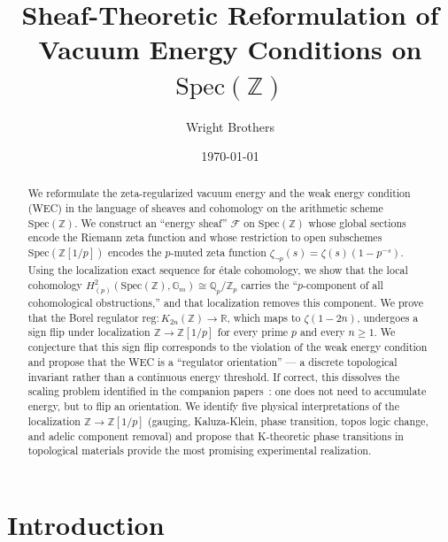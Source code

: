 \documentclass[aps,prd,twocolumn,superscriptaddress,nofootinbib]{revtex4-2}
\newcommand{\Spec}{\mathrm{Spec}}
\newcommand{\Zp}{\mathbb{Z}[1/p]}
\newcommand{\Qp}{\mathbb{Q}_p}
\newcommand{\Gm}{\mathbb{G}_m}
\begin{document}
\title{Sheaf-Theoretic Reformulation of\\
  Vacuum Energy Conditions on $\Spec(\mathbb{Z})$}

\author{Wright Brothers}
\date{\today}

\begin{abstract}
We reformulate the zeta-regularized vacuum energy and the weak
energy condition (WEC) in the language of sheaves and cohomology
on the arithmetic scheme $\Spec(\mathbb{Z})$.
We construct an ``energy sheaf'' $\mathcal{F}$ on $\Spec(\mathbb{Z})$
whose global sections encode the Riemann zeta function and whose
restriction to open subschemes $\Spec(\Zp)$ encodes the $p$-muted
zeta function $\zeta_{\neg p}(s) = \zeta(s)(1-p^{-s})$.
Using the localization exact sequence for \'etale cohomology,
we show that the local cohomology $H^2_{(p)}(\Spec(\mathbb{Z}), \Gm) \cong \Qp/\mathbb{Z}_p$
carries the ``$p$-component of all cohomological obstructions,''
and that localization removes this component.
We prove that the Borel regulator $\mathrm{reg}: K_{2n}(\mathbb{Z}) \to \mathbb{R}$,
which maps to $\zeta(1-2n)$, undergoes a sign flip under localization
$\mathbb{Z} \to \Zp$ for every prime $p$ and every $n \geq 1$.
We conjecture that this sign flip corresponds to the violation of
the weak energy condition and propose that the WEC is a
``regulator orientation'' --- a discrete topological invariant
rather than a continuous energy threshold.
If correct, this dissolves the scaling problem identified in the
companion papers~\cite{paper_A,paper_C}: one does not need to
accumulate energy, but to flip an orientation.
We identify five physical interpretations of the localization
$\mathbb{Z} \to \Zp$ (gauging, Kaluza-Klein, phase transition,
topos logic change, and adelic component removal) and propose
that K-theoretic phase transitions in topological materials
provide the most promising experimental realization.
\end{abstract}

\maketitle

\section{Introduction}
\label{sec:intro}
\end{document}
